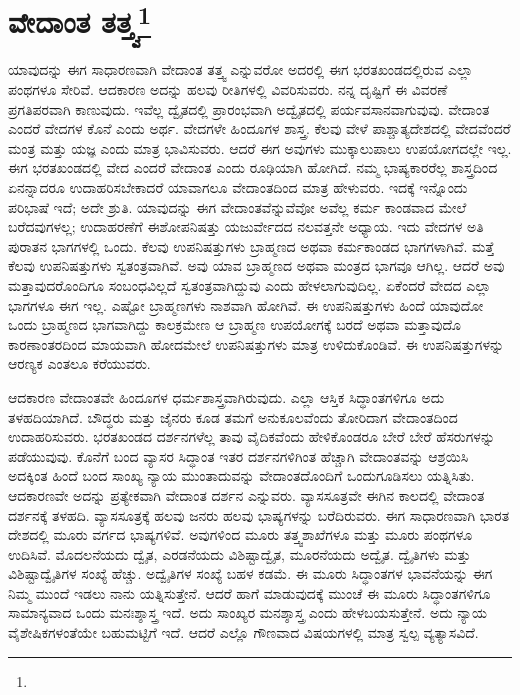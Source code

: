
\chapter{ವೇದಾಂತ ತತ್ತ್ವ\protect\footnote{}}

ಯಾವುದನ್ನು ಈಗ ಸಾಧಾರಣವಾಗಿ ವೇದಾಂತ ತತ್ತ್ವ ಎನ್ನುವರೋ ಅದರಲ್ಲಿ ಈಗ ಭರತಖಂಡದಲ್ಲಿರುವ ಎಲ್ಲಾ ಪಂಥಗಳೂ ಸೇರಿವೆ. ಆದಕಾರಣ ಅದನ್ನು ಹಲವು ರೀತಿಗಳಲ್ಲಿ ವಿವರಿಸುವರು. ನನ್ನ ದೃಷ್ಟಿಗೆ ಈ ವಿವರಣೆ ಪ್ರಗತಿಪರವಾಗಿ ಕಾಣುವುದು. ಇವೆಲ್ಲ ದ್ವೈತದಲ್ಲಿ ಪ್ರಾರಂಭವಾಗಿ ಅದ್ವೈತದಲ್ಲಿ ಪರ್ಯವಸಾನವಾಗುವುವು. ವೇದಾಂತ ಎಂದರೆ ವೇದಗಳ ಕೊನೆ ಎಂದು ಅರ್ಥ. ವೇದಗಳೇ ಹಿಂದೂಗಳ ಶಾಸ್ತ್ರ. ಕೆಲವು ವೇಳೆ ಪಾಶ್ಚಾತ್ಯದೇಶದಲ್ಲಿ ವೇದವೆಂದರೆ ಮಂತ್ರ ಮತ್ತು ಯಜ್ಞ ಎಂದು ಮಾತ್ರ ಭಾವಿಸುವರು. ಆದರೆ ಈಗ ಅವುಗಳು ಮುಕ್ಕಾಲುಪಾಲು ಉಪಯೋಗದಲ್ಲೇ ಇಲ್ಲ. ಈಗ ಭರತಖಂಡದಲ್ಲಿ ವೇದ ಎಂದರೆ ವೇದಾಂತ ಎಂದು ರೂಢಿಯಾಗಿ ಹೋಗಿದೆ. ನಮ್ಮ ಭಾಷ್ಯಕಾರರೆಲ್ಲ ಶಾಸ್ತ್ರದಿಂದ ಏನನ್ನಾದರೂ ಉದಾಹರಿಸಬೇಕಾದರೆ ಯಾವಾಗಲೂ ವೇದಾಂತದಿಂದ ಮಾತ್ರ ಹೇಳುವರು. ಇದಕ್ಕೆ ಇನ್ನೊಂದು ಪರಿಭಾಷೆ ಇದೆ; ಅದೇ ಶ್ರುತಿ. ಯಾವುದನ್ನು ಈಗ ವೇದಾಂತವೆನ್ನುವೆವೋ ಅವೆಲ್ಲ ಕರ್ಮ ಕಾಂಡವಾದ ಮೇಲೆ ಬರೆದವುಗಳಲ್ಲ; ಉದಾಹರಣೆಗೆ ಈಶೋಪನಿಷತ್ತು ಯಜುರ್ವೇದದ ನಲವತ್ತನೇ ಅಧ್ಯಾಯ. ಇದು ವೇದಗಳ ಅತಿ ಪುರಾತನ ಭಾಗಗಳಲ್ಲಿ ಒಂದು. ಕೆಲವು ಉಪನಿಷತ್ತುಗಳು ಬ್ರಾಹ್ಮಣದ ಅಥವಾ ಕರ್ಮಕಾಂಡದ ಭಾಗಗಳಾಗಿವೆ. ಮತ್ತೆ ಕೆಲವು ಉಪನಿಷತ್ತುಗಳು ಸ್ವತಂತ್ರವಾಗಿವೆ. ಅವು ಯಾವ ಬ್ರಾಹ್ಮಣದ ಅಥವಾ ಮಂತ್ರದ ಭಾಗವೂ ಆಗಿಲ್ಲ. ಆದರೆ ಅವು ಮತ್ತಾವುದರೊಂದಿಗೂ ಸಂಬಂಧವಿಲ್ಲದೆ ಸ್ವತಂತ್ರವಾಗಿದ್ದುವು ಎಂದು ಹೇಳಲಾಗುವುದಿಲ್ಲ. ಏಕೆಂದರೆ ವೇದದ ಎಲ್ಲಾ ಭಾಗಗಳೂ ಈಗ ಇಲ್ಲ. ಎಷ್ಟೋ ಬ್ರಾಹ್ಮಣಗಳು ನಾಶವಾಗಿ ಹೋಗಿವೆ. ಈ ಉಪನಿಷತ್ತುಗಳು ಹಿಂದೆ ಯಾವುದೋ ಒಂದು ಬ್ರಾಹ್ಮಣದ ಭಾಗವಾಗಿದ್ದು ಕಾಲಕ್ರಮೇಣ ಆ ಬ್ರಾಹ್ಮಣ ಉಪಯೋಗಕ್ಕೆ ಬರದೆ ಅಥವಾ ಮತ್ತಾವುದೊ ಕಾರಣಾಂತರದಿಂದ ಮಾಯವಾಗಿ ಹೋದಮೇಲೆ ಉಪನಿಷತ್ತುಗಳು ಮಾತ್ರ ಉಳಿದುಕೊಂಡಿವೆ. ಈ ಉಪನಿಷತ್ತುಗಳನ್ನು ಆರಣ್ಯಕ ಎಂತಲೂ ಕರೆಯುವರು.

ಆದಕಾರಣ ವೇದಾಂತವೇ ಹಿಂದೂಗಳ ಧರ್ಮಶಾಸ್ತ್ರವಾಗಿರುವುದು. ಎಲ್ಲಾ ಆಸ್ತಿಕ ಸಿದ್ಧಾಂತಗಳಿಗೂ ಅದು ತಳಹದಿಯಾಗಿದೆ. ಬೌದ್ಧರು ಮತ್ತು ಜೈನರು ಕೂಡ ತಮಗೆ ಅನುಕೂಲವೆಂದು ತೋರಿದಾಗ ವೇದಾಂತದಿಂದ ಉದಾಹರಿಸುವರು. ಭರತಖಂಡದ ದರ್ಶನಗಳೆಲ್ಲ ತಾವು ವೈದಿಕವೆಂದು ಹೇಳಿಕೊಂಡರೂ ಬೇರೆ ಬೇರೆ ಹೆಸರುಗಳನ್ನು ಪಡೆಯುವುವು. ಕೊನೆಗೆ ಬಂದ ವ್ಯಾಸರ ಸಿದ್ಧಾಂತ ಇತರ ದರ್ಶನಗಳಿಗಿಂತ ಹೆಚ್ಚಾಗಿ ವೇದಾಂತವನ್ನು ಆಶ್ರಯಿಸಿ ಅದಕ್ಕಿಂತ ಹಿಂದೆ ಬಂದ ಸಾಂಖ್ಯ ನ್ಯಾಯ ಮುಂತಾದುವನ್ನು ವೇದಾಂತದೊಂದಿಗೆ ಒಂದುಗೂಡಿಸಲು ಯತ್ನಿಸಿತು. ಆದಕಾರಣವೇ ಅದನ್ನು ಪ್ರತ್ಯೇಕವಾಗಿ ವೇದಾಂತ ದರ್ಶನ ಎನ್ನುವರು. ವ್ಯಾಸಸೂತ್ರವೇ ಈಗಿನ ಕಾಲದಲ್ಲಿ ವೇದಾಂತ ದರ್ಶನಕ್ಕೆ ತಳಹದಿ. ವ್ಯಾಸಸೂತ್ರಕ್ಕೆ ಹಲವು ಜನರು ಹಲವು ಭಾಷ್ಯಗಳನ್ನು ಬರೆದಿರುವರು. ಈಗ ಸಾಧಾರಣವಾಗಿ ಭಾರತ ದೇಶದಲ್ಲಿ ಮೂರು ವರ್ಗದ ಭಾಷ್ಯಗಳಿವೆ. ಅವುಗಳಿಂದ ಮೂರು ತತ್ತ್ವಶಾಖೆಗಳೂ ಮತ್ತು ಮೂರು ಪಂಥಗಳೂ ಉದಿಸಿವೆ. ಮೊದಲನೆಯದು ದ್ವೈತ, ಎರಡನೆಯದು ವಿಶಿಷ್ಟಾದ್ವೈತ, ಮೂರನೆಯದು ಅದ್ವೈತ. ದ್ವೈತಿಗಳು ಮತ್ತು ವಿಶಿಷ್ಟಾದ್ವೈತಿಗಳ ಸಂಖ್ಯೆ ಹೆಚ್ಚು. ಅದ್ವೈತಿಗಳ ಸಂಖ್ಯೆ ಬಹಳ ಕಡಮೆ. ಈ ಮೂರು ಸಿದ್ಧಾಂತಗಳ ಭಾವನೆಯನ್ನು ಈಗ ನಿಮ್ಮ ಮುಂದೆ ಇಡಲು ನಾನು ಯತ್ನಿಸುತ್ತೇನೆ. ಆದರೆ ಹಾಗೆ ಮಾಡುವುದಕ್ಕೆ ಮುಂಚೆ ಈ ಮೂರು ಸಿದ್ಧಾಂತಗಳಿಗೂ ಸಾಮಾನ್ಯವಾದ ಒಂದು ಮನಃಶ್ಶಾಸ್ತ್ರ ಇದೆ. ಅದು ಸಾಂಖ್ಯರ ಮನಶ್ಶಾಸ್ತ್ರ ಎಂದು ಹೇಳಬಯಸುತ್ತೇನೆ. ಅದು ನ್ಯಾಯ ವೈಶೇಷಿಕಗಳಂತೆಯೇ ಬಹುಮಟ್ಟಿಗೆ ಇದೆ. ಆದರೆ ಎಲ್ಲೊ ಗೌಣವಾದ ವಿಷಯಗಳಲ್ಲಿ ಮಾತ್ರ ಸ್ವಲ್ಪ ವ್ಯತ್ಯಾಸವಿದೆ.

